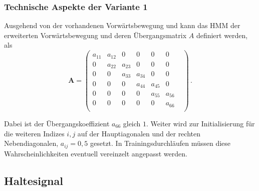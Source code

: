 \subsubsection{Technische Aspekte der Variante 1}
Ausgehend von der vorhandenen Vorw\"artsbewegung und kann das \acrshort{HMM} der erweiterten 
Vorw\"artsbewegung und deren \"Ubergangsmatrix $A$ definiert werden, als
\begin{equation}
\mathbf{A} = 
\begin{pmatrix}
a_{11} & a_{12} & 0 & 0 & 0 & 0 & \\
0 & a_{22} & a_{23} & 0 & 0 & 0 & \\
0 & 0 & a_{33} & a_{34} & 0 & 0 & \\
0 & 0 & 0 & a_{44} & a_{45} & 0 & \\
0 & 0 & 0 & 0 & a_{55} & a_{56} & \\
0 & 0 & 0 & 0 & 0 & a_{66} \\
\end{pmatrix} \, .
\end{equation}

Dabei ist der \"Ubergangskoeffizient $a_{66}$ gleich $1$. Weiter wird zur Initialisierung f\"ur die weiteren Indizes $i, j$ auf der Hauptiagonalen und der rechten Nebendiagonalen, $a_{ij} = 0,5$ gesetzt. In Trainingsdurchl\"aufen m\"ussen diese Wahrscheinlichkeiten eventuell vereinzelt angepasst werden.

\subsection{Haltesignal}

